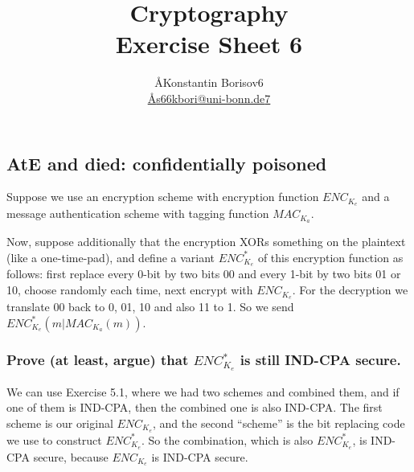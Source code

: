 \documentclass{article}
\title{Cryptography \\ Exercise Sheet 6}
\author{
  \AA{Konstantin Borisov}{6} \\
  \href{mailto:\AA{s66kbori@uni-bonn.de}{7}}{\AA{s66kbori@uni-bonn.de}{7}}
}
\begin{document}
  \maketitle

  \setcounter{section}{6}
  \subsection{AtE and died: confidentially poisoned}
  \begin{centerframebox}
    Suppose we use an encryption scheme with encryption function $ENC_{K_e}$
    and a message authentication scheme with tagging function $MAC_{K_a}$.

    Now, suppose additionally that the encryption XORs something on the plaintext (like a one-time-pad),
    and define a variant $ENC^*_{K_e}$ of this encryption function as follows:
    first replace every 0-bit by two bits 00 and every 1-bit by two bits 01 or 10,
    choose randomly each time, next encrypt with $ENC_{K_e}$.
    For the decryption we translate 00 back to 0, 01, 10 and also 11 to 1. So we send $ENC^*_{K_e} (m| MAC_{K_a} (m))$.
  \end{centerframebox}
  \subsubsection{Prove (at least, argue) that $ENC^*_{K_e}$ is still IND-CPA secure.}
  We can use Exercise 5.1, where we had two schemes and combined them,
  and if one of them is IND-CPA, then the combined one is also IND-CPA.
  The first scheme is our original $ENC_{K_e}$, and the second ``scheme'' is the bit replacing code we use to construct $ENC^*_{K_e}$.
  So the combination, which is also $ENC^*_{K_e}$, is IND-CPA secure, because $ENC_{K_e}$ is IND-CPA secure.
\end{document}

